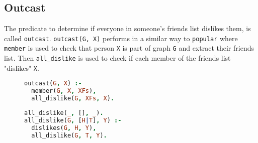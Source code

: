 \documentclass{article}
\begin{document}
\subsection{Outcast}
The predicate to determine if everyone in someone's friends list dislikes them, is called \texttt{outcast}. \texttt{outcast(G, X)} performs in a similar way to \texttt{popular} where \texttt{member} is used to check that person \texttt{X} is part of graph \texttt{G} and extract their friends list. Then \texttt{all\_dislike} is used to check if each member of the friends list "dislikes" \texttt{X}.
\begin{figure}[h!]
\begin{minipage}{0.5\textwidth}
\begin{lstlisting}[language=Prolog]
outcast(G, X) :-
  member(G, X, XFs),
  all_dislike(G, XFs, X).
\end{lstlisting}
\end{minipage}
\begin{minipage}{0.5\textwidth}
\begin{lstlisting}[language=Prolog]
all_dislike(_, [], _).
all_dislike(G, [H|T], Y) :-
  dislikes(G, H, Y),
  all_dislike(G, T, Y).
\end{lstlisting}
\end{minipage}
\end{figure}
\end{document}

